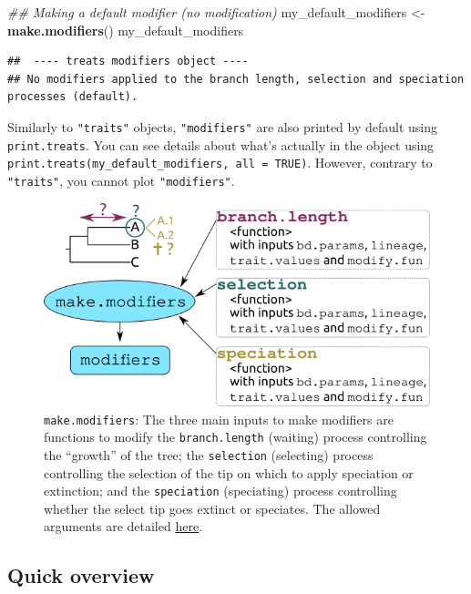 \documentclass[
]{book}
\newenvironment{Shaded}{\begin{snugshade}}{\end{snugshade}}
\newcommand{\CommentTok}[1]{\textcolor[rgb]{0.56,0.35,0.01}{\textit{#1}}}
\newcommand{\KeywordTok}[1]{\textcolor[rgb]{0.13,0.29,0.53}{\textbf{#1}}}
\newcommand{\NormalTok}[1]{#1}
\newcommand{\StringTok}[1]{\textcolor[rgb]{0.31,0.60,0.02}{#1}}
\begin{document}
\begin{Shaded}
\begin{Highlighting}[]
\CommentTok{\#\# Making a default modifier (no modification)}
\NormalTok{my\_default\_modifiers \textless{}{-}}\StringTok{ }\KeywordTok{make.modifiers}\NormalTok{()}
\NormalTok{my\_default\_modifiers}
\end{Highlighting}
\end{Shaded}

\begin{verbatim}
##  ---- treats modifiers object ---- 
## No modifiers applied to the branch length, selection and speciation processes (default).
\end{verbatim}

Similarly to \texttt{"traits"} objects, \texttt{"modifiers"} are also printed by default using \texttt{print.treats}.
You can see details about what's actually in the object using \texttt{print.treats(my\_default\_modifiers,\ all\ =\ TRUE)}.
However, contrary to \texttt{"traits"}, you cannot plot \texttt{"modifiers"}.

\begin{figure}
\centering
\includegraphics{make.modifiers.png}
\caption{\texttt{make.modifiers}: The three main inputs to make modifiers are functions to modify the \texttt{branch.length} (waiting) process controlling the ``growth'' of the tree; the \texttt{selection} (selecting) process controlling the selection of the tip on which to apply speciation or extinction; and the \texttt{speciation} (speciating) process controlling whether the select tip goes extinct or speciates. The allowed arguments are detailed \protect\hyperlink{allowarguments}{here}.}
\end{figure}

\hypertarget{quick-overview-1}{%
\subsection{Quick overview}\label{quick-overview-1}}
\end{document}
